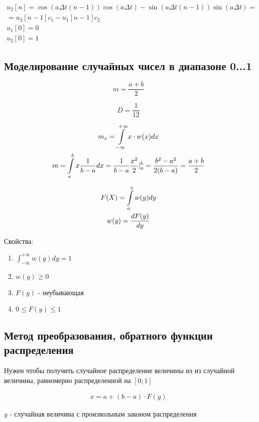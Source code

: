 \documentclass[14pt,a4paper,oneside]{extarticle}
\begin{document}
\begin{gather*}
    u_2[n]=\cos(a\Delta t(n-1))\cos(a\Delta t)-\sin(a\Delta t(n-1))\sin(a\Delta t)=\\
    =u_2[n-1]c_1-u_1[n-1]c_2\\
    u_1[0]=0\\
    u_2[0]=1
\end{gather*}

\subsection{Моделирование случайных чисел в диапазоне 0...1}

\[m=\frac{a+b}{2}\]

\[D=\frac{1}{12}\]

\begin{gather*}
    m_x=\int\displaylimits_{-\infty}^{+\infty} x\cdot w(x)dx\\
    m=\int\displaylimits_{a}^{b}x\frac{1}{b-a}dx=\frac{1}{b-a}\frac{x^2}{2}|_a^b=\frac{b^2-a^2}{2(b-a)}=\frac{a+b}{2}
\end{gather*}

\begin{gather*}
    F(X)=\int\displaylimits_{a}^{x}w(y)dy\\
    w(y)=\frac{dF(y)}{dy}\\
\end{gather*}

Свойства:

\begin{enumerate}
    \item $\int_{-\infty}^{+\infty}w(y)dy=1$
    \item $w(y)\geq 0$
    \item $F(y)$ - неубывающая
    \item $0\leq F(y)\leq 1$
\end{enumerate}

\subsection{Метод преобразования, обратного функции распределения}

Нужен чтобы получить случайное распределение величины из из случайной величины, равномерно распределенной на $[0;1]$

\begin{gather*}
    x=a+(b-a)\cdot F\left({y}\right)
\end{gather*}

$y$ - случайная величина с произвольным законом распределения
\end{document}
